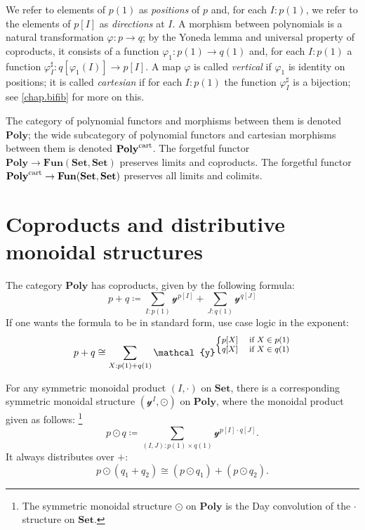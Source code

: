 \documentclass[11pt, one side, article]{memoir}
\theoremstyle{definition}
\theoremstyle{plain}
\newcommand{\Cat}[1]{\mathbf{#1}}%
\newcommand{\tn}[1]{\textnormal{#1}}
\newcommand{\smset}{\Cat{Set}}
\newcommand{\yon}{\mathcal{y}}
\newcommand{\poly}{\Cat{Poly}}
\newcommand{\polycart}{\poly^{\tn{cart}}}
\newcommand{\0}{\textsf{0}}
\newcommand{\1}{\tn{\textsf{1}}}
\begin{document}
We refer to elements of $p(1)$ as \emph{positions} of $p$ and, for each $I: p(1)$, we refer to the elements of $p[I]$ as \emph{directions} at $I$. A morphism between polynomials is a natural transformation $\varphi\colon p\to q$; by the Yoneda lemma and universal property of coproducts, it consists of a function $\varphi_1\colon p(1)\to q(1)$ and, for each $I: p(1)$ a function $\varphi^\sharp_I\colon q[\varphi_1(I)]\to p[I]$. A map $\varphi$ is called \emph{vertical} if $\varphi_1$ is identity on positions; it is called \emph{cartesian} if for each $I: p(1)$ the function $\varphi_I^\sharp$ is a bijection; see \cref{chap.bifib} for more on this. 

The category of polynomial functors and morphisms between them is denoted $\poly$; the wide subcategory of polynomial functors and cartesian morphisms between them is denoted $\polycart$. The forgetful functor $\poly\to\Cat{Fun}(\smset,\smset)$ preserves limits and coproducts. The forgetful functor $\polycart\to\Cat{Fun}(\smset,\smset)$ preserves all limits and colimits.


\chapter{Coproducts and distributive monoidal structures}

The category $\poly$ has coproducts, given by the following formula:
\begin{equation}
p+q\coloneqq\sum_{I: p(1)}\yon^{p[I]}+\sum_{J: q(1)}\yon^{q[J]}
\end{equation}
If one wants the formula to be in standard form, use case logic in the exponent:
\begin{equation}
p+q\cong\sum_{X: p(1)+q(1)}\yon^{\fontsize{8pt}{8pt}\selectfont
	\begin{cases}
  	p[X]&\tn{ if }X\in p(1)\\
  	q[X]&\tn{ if }X\in q(1)
	\end{cases}\normalsize
	}
\end{equation}

For any symmetric monoidal product $(I,\cdot)$ on $\smset$, there is a corresponding symmetric monoidal structure $(\yon^I,\odot)$ on $\poly$, where the monoidal product given as follows:%
\footnote{The symmetric monoidal structure $\odot$ on $\poly$ is the Day convolution of the $\cdot$ structure on $\smset$.}
\begin{equation}
p\odot q\coloneqq\sum_{(I,J): p(1)\times q(1)}\yon^{p[I]\cdot q[J]}.
\end{equation}
It always distributes over $+$:
\begin{equation}
p\odot(q_1+q_2)\cong (p\odot q_1)+(p\odot q_2).
\end{equation}
\end{document}
